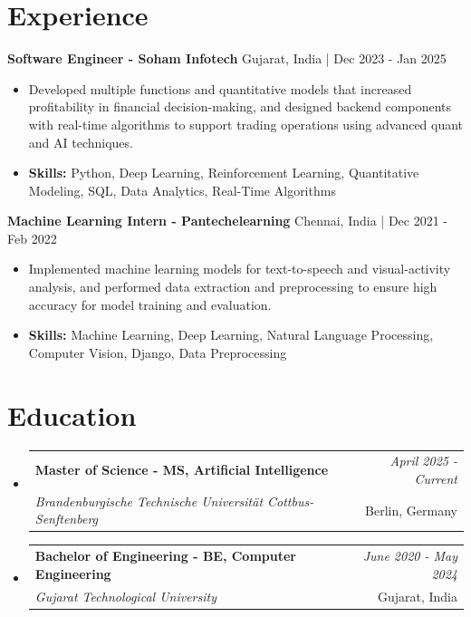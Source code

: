 \documentclass[a4paper,11pt]{article}
\makeatletter
\newcommand{\resumeSubheading}[4]{
\vspace{0.5mm}\item
    \begin{tabular*}{\linewidth}[t]{l@{\extracolsep{\fill}}r}
        \textbf{#1} & \textit{\footnotesize{#4}} \\
        \textit{\footnotesize{#3}} &  \footnotesize{#2}\\
    \end{tabular*}
    \vspace{-2.4mm}
}
\makeatother
\begin{document}
\section{\textbf{Experience}}


\vspace{1mm}
  \textbf{Software Engineer - Soham Infotech} \hfill Gujarat, India | Dec 2023 - Jan 2025
\vspace{-1.5mm} %
\begin{itemize}
  \item Developed multiple functions and quantitative models that increased profitability in financial decision-making, and designed backend components with real-time algorithms to support trading operations using advanced quant and AI techniques.

\vspace{-2mm}
  \item \textbf{Skills:} Python, Deep Learning, Reinforcement Learning, Quantitative Modeling, SQL, Data Analytics, Real-Time Algorithms
\end{itemize}

\vspace{1mm}
  \textbf{Machine Learning Intern - Pantechelearning} \hfill Chennai, India | Dec 2021 - Feb 2022
\vspace{-1.5mm} %
\begin{itemize}
  \item Implemented machine learning models for text-to-speech and visual-activity analysis, and performed data extraction and preprocessing to ensure high accuracy for model training and evaluation.
\vspace{-2mm}
  \item \textbf{Skills:} Machine Learning, Deep Learning, Natural Language Processing, Computer Vision, Django, Data Preprocessing
\end{itemize}\section{\textbf{Education}}
\vspace{-0.4mm}

\begin{itemize}[leftmargin=0.15in, label={}]
\resumeSubheading
{Master of Science - MS, Artificial Intelligence }{Berlin, Germany}
{Brandenburgische Technische Universität Cottbus-Senftenberg  }{April 2025 - Current}

\vspace{1.0mm} %
\resumeSubheading
{Bachelor of Engineering - BE, Computer Engineering  }{Gujarat, India}
{Gujarat Technological University }{June 2020 - May 2024}

\end{itemize}
\end{document}

